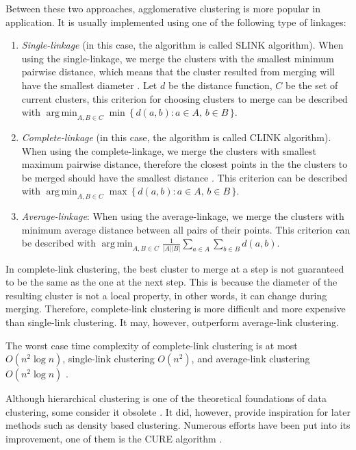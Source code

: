 \documentclass[conference]{IEEEtran}
\begin{document}
Between these two approaches, agglomerative clustering is more popular in application. It is usually implemented using one of the following type of linkages:

\begin{enumerate}
\item \textit{Single-linkage} (in this case, the algorithm is called SLINK algorithm). When using the single-linkage, we merge the clusters with the smallest minimum pairwise distance, which means that the cluster resulted from merging will have the smallest diameter \cite{defays1977efficient}. Let $d$ be the distance function, $C$ be the set of current clusters, this criterion for choosing clusters to merge can be described with $\operatorname{arg\,min}_{A, B \in C}\min \, \{\, d(a,b) : a \in A,\, b \in B \,\}$.

\item \textit{Complete-linkage} (in this case, the algorithm is called CLINK algorithm). When using the complete-linkage, we merge the clusters with smallest maximum pairwise distance, therefore the closest points in the the clusters to be merged should have the smallest distance \cite{sibson1973slink}. This criterion can be described with $\operatorname{arg\,min}_{A, B \in C}\max \, \{\, d(a,b) : a \in A,\, b \in B \,\}$.

\item \textit{Average-linkage}: When using the average-linkage, we merge the clusters with minimum average distance between all pairs of their points.  This criterion can be described with $\operatorname{arg\,min}_{A, B \in C} \frac{1}{|A| |B|} \sum_{a \in A }\sum_{ b \in B} d(a,b)$.
\end{enumerate}

In complete-link clustering, the best cluster to merge at a step is not guaranteed to be the same as the one at the next step. This is because the diameter of the resulting cluster is not a local property, in other words, it can change during merging. Therefore, complete-link clustering is more difficult and more expensive than single-link clustering. It may, however, outperform average-link clustering.

The worst case time complexity of complete-link clustering is at most $O(n^2 \log n)$, single-link clustering $O(n^2)$, and average-link clustering $O(n^2 \log n)$ \cite{gan2007data}.

Although hierarchical clustering is one of the theoretical foundations of data clustering, some consider it obsolete \cite{jain2012survey}. It did, however, provide inspiration for later methods such as density based clustering. Numerous efforts have been put into its improvement, one of them is the CURE algorithm \cite{guha1998cure}.
\end{document}
